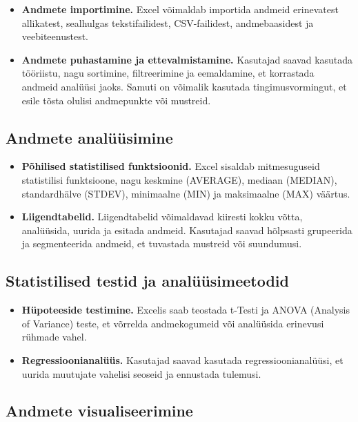 \documentclass[
]{book}
\providecommand{\tightlist}{%
  \setlength{\itemsep}{0pt}\setlength{\parskip}{0pt}}
\begin{document}
\begin{itemize}
\tightlist
\item
  \textbf{Andmete importimine.} Excel võimaldab importida andmeid erinevatest allikatest, sealhulgas tekstifailidest, CSV-failidest, andmebaasidest ja veebiteenustest.
\item
  \textbf{Andmete puhastamine ja ettevalmistamine.} Kasutajad saavad kasutada tööriistu, nagu sortimine, filtreerimine ja eemaldamine, et korrastada andmeid analüüsi jaoks. Samuti on võimalik kasutada tingimusvormingut, et esile tõsta olulisi andmepunkte või mustreid.
\end{itemize}

\subsection{Andmete analüüsimine}\label{andmete-analuxfcuxfcsimine}

\begin{itemize}
\tightlist
\item
  \textbf{Põhilised statistilised funktsioonid.} Excel sisaldab mitmesuguseid statistilisi funktsioone, nagu keskmine (AVERAGE), mediaan (MEDIAN), standardhälve (STDEV), minimaalne (MIN) ja maksimaalne (MAX) väärtus.
\item
  \textbf{Liigendtabelid.} Liigendtabelid võimaldavad kiiresti kokku võtta, analüüsida, uurida ja esitada andmeid. Kasutajad saavad hõlpsasti grupeerida ja segmenteerida andmeid, et tuvastada mustreid või suundumusi.
\end{itemize}

\subsection{Statistilised testid ja analüüsimeetodid}\label{statistilised-testid-ja-analuxfcuxfcsimeetodid}

\begin{itemize}
\tightlist
\item
  \textbf{Hüpoteeside testimine.} Excelis saab teostada t-Testi ja ANOVA (Analysis of Variance) teste, et võrrelda andmekogumeid või analüüsida erinevusi rühmade vahel.
\item
  \textbf{Regressioonianalüüs.} Kasutajad saavad kasutada regressioonianalüüsi, et uurida muutujate vahelisi seoseid ja ennustada tulemusi.
\end{itemize}

\subsection{Andmete visualiseerimine}\label{andmete-visualiseerimine-1}
\end{document}
